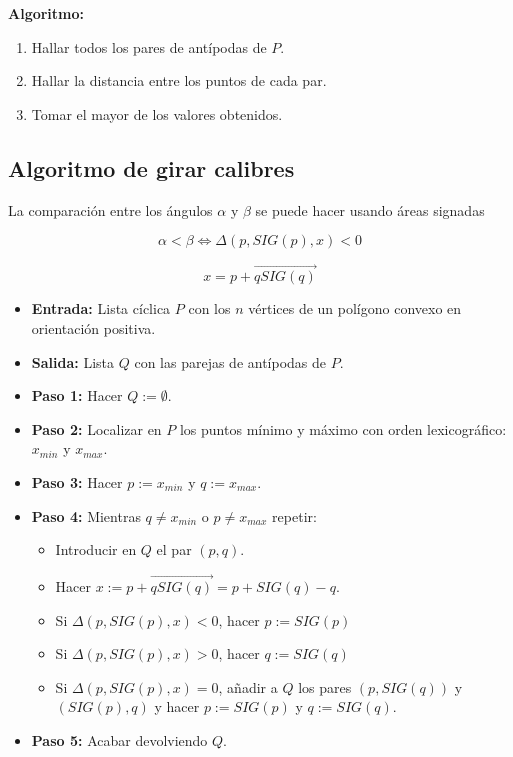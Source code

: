 \documentclass[twoside]{report}
\begin{document}
{\bf Algoritmo:}

\begin{enumerate}
  \item Hallar todos los pares de antípodas de $P$.
  \item Hallar la distancia entre los puntos de cada par.
  \item Tomar el mayor de los valores obtenidos.
\end{enumerate}


\subsection{Algoritmo de girar calibres}


\begin{nota} La comparación entre los ángulos $\alpha$ y $\beta$ se puede hacer
usando áreas signadas

 $$\alpha<\beta \Leftrightarrow \Delta(p,SIG(p),x)<0$$

 $$x=p+\overrightarrow{qSIG(q)}$$

\end{nota}

\begin{itemize}
  \item\textbf{Entrada:} Lista cíclica $P$ con los $n$ vértices de un polígono
convexo en orientación positiva.
  \item\textbf{Salida:} Lista $Q$ con las parejas de antípodas de $P$.
  \item\textbf{Paso 1:} Hacer $Q:=\emptyset$.
  \item\textbf{Paso 2:} Localizar en $P$ los puntos mínimo y máximo con orden
lexicográfico: $x_{min}$ y $x_{max}$.
  \item\textbf{Paso 3:} Hacer $p:=x_{min}$ y $q:=x_{max}$.
  \item\textbf{Paso 4:} Mientras $q\neq x_{min}$ o $p\neq x_{max}$ repetir:
\begin{itemize}
  \item Introducir en $Q$ el par $(p,q)$.
  \item Hacer $x:=p+\overrightarrow{qSIG(q)}=p+SIG(q)-q$.
  \item Si $\Delta(p,SIG(p),x)<0$, hacer $p:=SIG(p)$
  \item Si $\Delta(p,SIG(p),x)>0$, hacer $q:=SIG(q)$
  \item Si $\Delta(p,SIG(p),x)=0$, añadir a $Q$ los pares $(p,SIG(q))$ y
$(SIG(p),q)$ y hacer $p:=SIG(p)$ y $q:=SIG(q)$.
\end{itemize}
  \item\textbf{Paso 5:} Acabar devolviendo $Q$.
\end{itemize}
\end{document}
